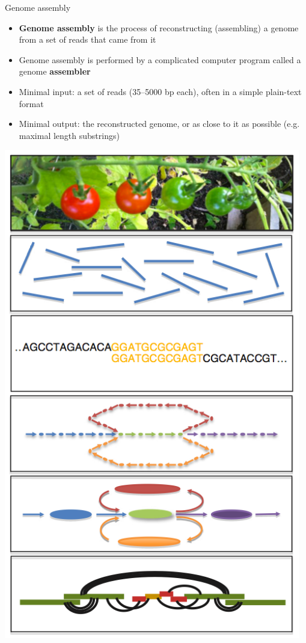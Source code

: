\documentclass[xcolor=dvipsnames]{beamer}
\begin{document}
\begin{frame}{Genome assembly}
    \begin{minipage}{0.63\textwidth}
        \begin{itemize}
            \item {\bf Genome assembly} is the process of reconstructing
                  (assembling) a genome from a set of reads that came from it
            \item Genome assembly is performed by a complicated computer program
                called a genome {\bf assembler}
            \item Minimal input: a set of reads (35--5000 bp each), often in a
                simple plain-text format
            \item Minimal output: the reconstructed genome, or as close to it as
                possible (e.g. maximal length substrings)
        \end{itemize}
    \end{minipage}
    \begin{minipage}{0.35\textwidth}
        \includegraphics[width=0.97\textwidth]{AssemblyFlow.jpg}
    \end{minipage}
\end{frame}
\end{document}
